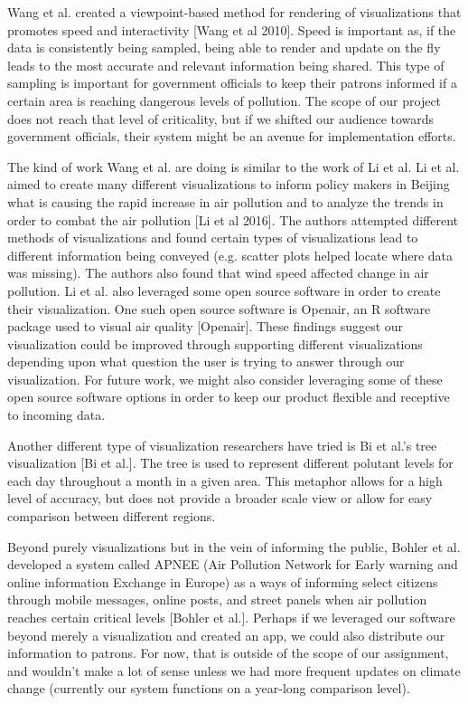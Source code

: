 \documentclass[journal]{vgtc}                %
\begin{document}
Wang et al. created a viewpoint-based method for rendering of visualizations that promotes speed and interactivity [Wang 
et al 2010]. Speed is important as, if the data is consistently being sampled, being able to render and update on the 
fly leads to the most accurate and relevant information being shared. This type of sampling is important for government
officials to keep their patrons informed if a certain area is reaching dangerous levels of pollution. The scope of our
project does not reach that level of criticality, but if we shifted our audience towards government officials, their
system might be an avenue for implementation efforts.

The kind of work Wang et al. are doing is similar to the work of Li et al. Li et al. aimed to create many different
visualizations to inform policy makers in Beijing what is causing the rapid increase in air pollution and to analyze
the trends in order to combat the air pollution [Li et al 2016]. The authors attempted different methods of 
visualizations and found certain types of visualizations lead to different information being conveyed (e.g. scatter
plots helped locate where data was missing). The authors also found that wind speed affected change in air pollution.
Li et al. also leveraged some open source software in order to create their visualization. One such open source software is
Openair, an R software package used to visual air quality [Openair].
These findings suggest our visualization could be improved through supporting different visualizations depending
upon what question the user is trying to answer through our visualization. For future work, we might also consider
leveraging some of these open source software options in order to keep our product flexible and receptive to incoming
data.

Another different type of visualization researchers have tried is Bi et al.'s tree visualization [Bi et al.]. The tree is
used to represent different polutant levels for each day throughout a month in a given area. This metaphor allows for
a high level of accuracy, but does not provide a broader scale view or allow for easy comparison between different regions.

Beyond purely visualizations but in the vein of informing the public, 
Bohler et al. developed a system called APNEE (Air Pollution Network for Early warning and online information Exchange in
 Europe) as a ways of informing select citizens through mobile messages, online posts, and street panels when air pollution
 reaches certain critical levels [Bohler et al.]. 
 Perhaps if we leveraged our software beyond merely a visualization and created an app, we
 could also distribute our information to patrons. For now, that is outside of the scope of our assignment, and wouldn't
 make a lot of sense unless we had more frequent updates on climate change (currently our system functions on a year-long
 comparison level).
\end{document}
